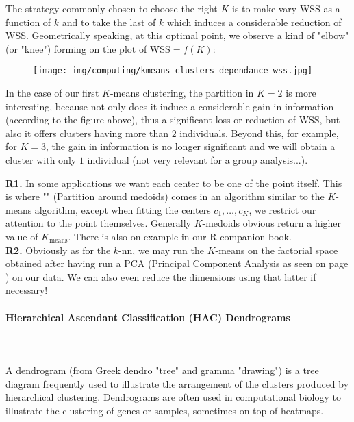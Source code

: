 	The strategy commonly chosen to choose the right $K$ is to make vary WSS as a function of $k$ and to take the last of $k$ which induces a considerable reduction of WSS. Geometrically speaking, at this optimal point, we observe a kind of "elbow" (or "knee") forming on the plot of $\text{WSS}=f(K)$:
	\begin{figure}[H]
		\centering
		\texttt{[image: img/computing/kmeans\_clusters\_dependance\_wss.jpg]}
	\end{figure}
	In the case of our first $K$-means clustering, the partition in $K=2$ is more interesting, because not only does it induce a considerable gain in information (according to the figure above), thus a significant loss or reduction of WSS, but also it offers clusters having more than $2$ individuals. Beyond this, for example, for $K=3$, the gain in information is no longer significant and we will obtain a cluster with only $1$ individual (not very relevant for a group analysis...).
	\begin{tcolorbox}[title=Remarks,colframe=black,arc=10pt]
	\textbf{R1.} In some applications we want each center to be one of the point itself. This is where "" (Partition around medoids) comes in an algorithm similar to the $K$-means algorithm, except when fitting the centers $c_1,\ldots,c_K$, we restrict our attention to the point themselves. Generally $K$-medoids obvious return a higher value of $K_{\text{means}}$. There is also on example in our R companion book.\\
	
	\textbf{R2.} Obviously as for the $k$-nn, we may run the $K$-means on the factorial space obtained after having run a PCA (Principal Component Analysis as seen on page \pageref{principal component analysis}) on our data. We can also even reduce the dimensions using that latter if necessary!
	\end{tcolorbox}

	
	\paragraph{Hierarchical Ascendant Classification (HAC) Dendrograms}\mbox{}\\\\
	A dendrogram (from Greek dendro "tree" and gramma "drawing") is a tree diagram frequently used to illustrate the arrangement of the clusters produced by hierarchical clustering. Dendrograms are often used in computational biology to illustrate the clustering of genes or samples, sometimes on top of heatmaps.
	
